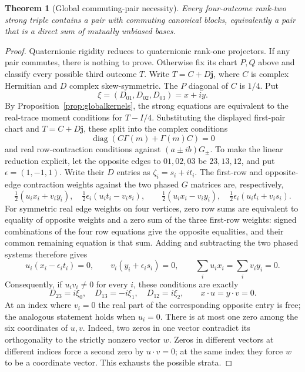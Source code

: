 \documentclass[11pt]{article}
\newtheorem{theorem}{Theorem}[section]
\begin{document}
\begin{theorem}[Global commuting-pair necessity]
\label{thm:globalcommuting}
Every four-outcome rank-two strong triple contains a pair with commuting
canonical blocks, equivalently a pair that is a direct sum of mutually
unbiased bases.
\end{theorem}
\begin{proof}
Quaternionic rigidity reduces to quaternionic rank-one projectors. If
any pair commutes, there is nothing to prove. Otherwise fix its chart
$P,Q$ above and classify every possible third outcome $T$.
Write $T=C+D\mathbf j$, where $C$ is complex Hermitian and $D$ complex
skew-symmetric. The $P$ diagonal of $C$ is $1/4$. Put
\[
 \xi=(D_{01},D_{02},D_{03})=x+iy.
\]
By Proposition~\ref{prop:globalkernels}, the strong equations are
equivalent to the real-trace moment conditions for $T-I/4$.
Substituting the displayed first-pair chart and $T=C+D\mathbf j$,
these split into the complex conditions
\begin{equation}\label{eq:globalClinear}
 \operatorname{diag}(C\Gamma(m)+\Gamma(m)C)=0
\end{equation}
and real row-contraction conditions against $(a\pm ib)G_\pm$.
To make the linear reduction explicit, let the opposite edges to
$01,02,03$ be $23,13,12$, and put $\epsilon=(1,-1,1)$.
Write their $D$ entries as $\zeta_i=s_i+it_i$. The first-row and
opposite-edge contraction weights against the two phased $G$ matrices
are, respectively,
\[
 \tfrac12(u_i x_i+v_i y_i),\quad
 \tfrac12\epsilon_i(u_i t_i-v_i s_i),\qquad
 \tfrac12(u_i x_i-v_i y_i),\quad
 \tfrac12\epsilon_i(u_i t_i+v_i s_i).
\]
For symmetric real edge weights on four vertices, zero row sums are
equivalent to equality of opposite weights and a zero sum of the three
first-row weights: signed combinations of the four row equations give
the opposite equalities, and their common remaining equation is that sum.
Adding and subtracting the two phased systems therefore gives
\[
 u_i(x_i-\epsilon_i t_i)=0,\qquad
 v_i(y_i+\epsilon_i s_i)=0,\qquad
 \sum_i u_i x_i=\sum_i v_i y_i=0.
\]
Consequently, if $u_i v_i\ne0$ for every $i$, these conditions are exactly
\begin{equation}\label{eq:globalDlinear}
 D_{23}=i\xi_0,\quad D_{13}=-i\xi_1,\quad D_{12}=i\xi_2,
 \qquad x\cdot u=y\cdot v=0.
\end{equation}
At an index where $v_i=0$ the real part of the corresponding opposite
entry is free; the analogous statement holds when $u_i=0$.
There is at most one zero among the six coordinates of $u,v$.
Indeed, two zeros in one vector contradict its orthogonality to the
strictly nonzero vector $w$. Zeros in different vectors at different
indices force a second zero by $u\cdot v=0$; at the same index they
force $w$ to be a coordinate vector. This exhausts the possible strata.


\end{proof}
\end{document}
